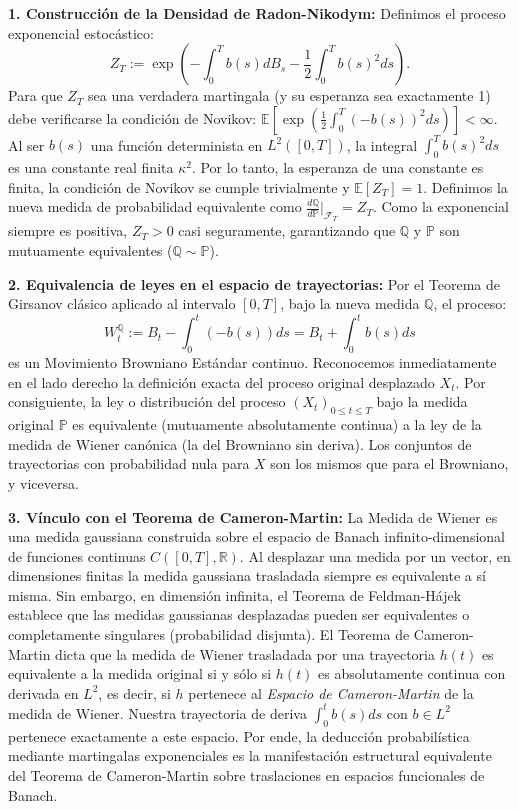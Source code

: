 \documentclass[11pt, letterpaper]{article}
\begin{document}
\begin{solucion}
    \textbf{1. Construcción de la Densidad de Radon-Nikodym:}
    Definimos el proceso exponencial estocástico:
    \[ Z_T := \exp\left( -\int_0^T b(s) dB_s - \frac{1}{2} \int_0^T b(s)^2 ds \right). \]
    Para que $Z_T$ sea una verdadera martingala (y su esperanza sea exactamente 1) debe verificarse la condición de Novikov:
    $\mathbb{E}\left[ \exp\left( \frac{1}{2} \int_0^T (-b(s))^2 ds \right) \right] < \infty$.
    Al ser $b(s)$ una función determinista en $L^2([0,T])$, la integral $\int_0^T b(s)^2 ds$ es una constante real finita $\kappa^2$.
    Por lo tanto, la esperanza de una constante es finita, la condición de Novikov se cumple trivialmente y $\mathbb{E}[Z_T] = 1$.
    Definimos la nueva medida de probabilidad equivalente como $\frac{d\mathbb{Q}}{d\mathbb{P}}\Big|_{\mathcal{F}_T} = Z_T$.
    Como la exponencial siempre es positiva, $Z_T > 0$ casi seguramente, garantizando que $\mathbb{Q}$ y $\mathbb{P}$ son mutuamente equivalentes ($\mathbb{Q} \sim \mathbb{P}$).

    \textbf{2. Equivalencia de leyes en el espacio de trayectorias:}
    Por el Teorema de Girsanov clásico aplicado al intervalo $[0,T]$, bajo la nueva medida $\mathbb{Q}$, el proceso:
    \[ W_t^{\mathbb{Q}} := B_t - \int_0^t (-b(s)) ds = B_t + \int_0^t b(s) ds \]
    es un Movimiento Browniano Estándar continuo.
    Reconocemos inmediatamente en el lado derecho la definición exacta del proceso original desplazado $X_t$.
    Por consiguiente, la ley o distribución del proceso $(X_t)_{0 \le t \le T}$ bajo la medida original $\mathbb{P}$ es equivalente (mutuamente absolutamente continua) a la ley de la medida de Wiener canónica (la del Browniano sin deriva). Los conjuntos de trayectorias con probabilidad nula para $X$ son los mismos que para el Browniano, y viceversa.

    \textbf{3. Vínculo con el Teorema de Cameron-Martin:}
    La Medida de Wiener es una medida gaussiana construida sobre el espacio de Banach infinito-dimensional de funciones continuas $C([0,T], \mathbb{R})$.
    Al desplazar una medida por un vector, en dimensiones finitas la medida gaussiana trasladada siempre es equivalente a sí misma. Sin embargo, en dimensión infinita, el Teorema de Feldman-Hájek establece que las medidas gaussianas desplazadas pueden ser equivalentes o completamente singulares (probabilidad disjunta).
    El Teorema de Cameron-Martin dicta que la medida de Wiener trasladada por una trayectoria $h(t)$ es equivalente a la medida original si y sólo si $h(t)$ es absolutamente continua con derivada en $L^2$, es decir, si $h$ pertenece al \textit{Espacio de Cameron-Martin} de la medida de Wiener.
    Nuestra trayectoria de deriva $\int_0^t b(s)ds$ con $b \in L^2$ pertenece exactamente a este espacio. Por ende, la deducción probabilística mediante martingalas exponenciales es la manifestación estructural equivalente del Teorema de Cameron-Martin sobre traslaciones en espacios funcionales de Banach.
\end{solucion}
\end{document}
